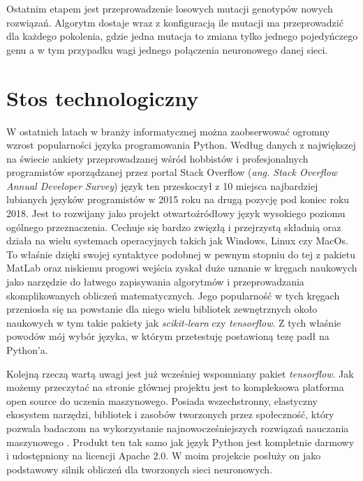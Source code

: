 \documentclass[12pt, oneside, a4paper]{report}
\begin{document}
Ostatnim etapem jest przeprowadzenie losowych mutacji genotypów nowych rozwiązań. Algorytm dostaje wraz z konfiguracją ile mutacji ma przeprowadzić dla każdego pokolenia, gdzie jedna mutacja to zmiana tylko jednego pojedyńczego genu a w tym przypadku wagi jednego połączenia neuronowego danej sieci.

\section{Stos technologiczny}

W ostatnich latach w branży informatycznej można zaobserwować ogromny wzrost popularności języka programowania Python. Według danych z największej na świecie ankiety przeprowadzanej wśród hobbistów i profesjonalnych programistów sporządzanej przez portal Stack Overflow (\textit{ang. Stack Overflow Annual Developer Survey}) \citep{stackoverflow-survey} język ten przeskoczył z 10 miejsca najbardziej lubianych języków programistów w 2015 roku na drugą pozycję pod koniec roku 2018. Jest to rozwijany jako projekt otwartoźródłowy język wysokiego poziomu ogólnego przeznaczenia. Cechuje się bardzo zwięzłą i przejrzystą składnią oraz działa na wielu systemach operacyjnych takich jak Windows, Linux czy MacOs. To właśnie dzięki swojej syntaktyce podobnej w pewnym stopniu do tej z pakietu MatLab oraz niskiemu progowi wejścia zyskał duże uznanie w kręgach naukowych jako narzędzie do łatwego zapisywania algorytmów i przeprowadzania skomplikowanych obliczeń matematycznych. Jego popularność w tych kręgach przeniosła się na powstanie dla niego wielu bibliotek zewnętrznych około naukowych w tym takie pakiety jak \textit{scikit-learn} czy \textit{tensorflow}. Z tych właśnie powodów mój wybór języka, w którym przetestuję postawioną tezę padł na Python'a.

Kolejną rzeczą wartą uwagi jest już wcześniej wspomniany pakiet \textit{tensorflow}. Jak możemy przeczytać na stronie głównej projektu jest to kompleksowa platforma open source do uczenia maszynowego. Posiada wszechstronny, elastyczny ekosystem narzędzi, bibliotek i zasobów tworzonych przez społeczność, który pozwala badaczom na wykorzystanie najnowocześniejszych rozwiązań nauczania maszynowego \citep{tensorflow-wesite}. Produkt ten tak samo jak język Python jest kompletnie darmowy i udostępniony na licencji Apache 2.0. W moim projekcie posłuży on jako podstawowy silnik obliczeń dla tworzonych sieci neuronowych.
\end{document}
